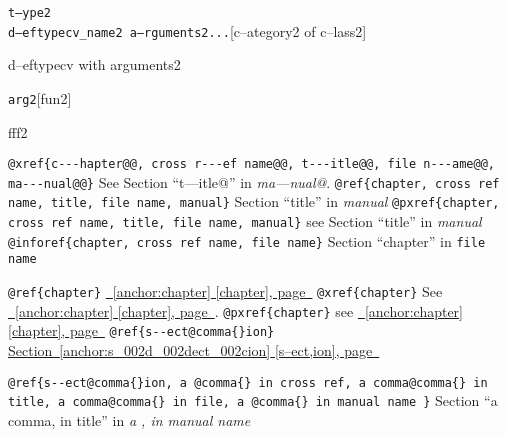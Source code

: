 \documentclass{book}
\begin{document}
\begin{titlepage}
\noindent\texttt\bgroup{}t--ype2\leavevmode{}\\d--eftypecv\_name2 a--rguments2...\egroup{}\hfill[c--ategory2 of c--lass2]



%
d--eftypecv with arguments2

\noindent\texttt\bgroup{}arg2\egroup{}\hfill[fun2]



%
fff2


\texttt{@xref\{c{-}{-}{-}hapter@@, cross r{-}{-}{-}ef name@@, t{-}{-}{-}itle@@, file n{-}{-}{-}ame@@, ma{-}{-}{-}nual@@\}} See Section ``t---itle@'' in \textit{ma---nual@}.
\texttt{@ref\{chapter, cross ref name, title, file name, manual\}} Section ``title'' in \textit{manual}
\texttt{@pxref\{chapter, cross ref name, title, file name, manual\}} see Section ``title'' in \textit{manual}
\texttt{@inforef\{chapter, cross ref name, file name\}} Section ``chapter'' in \texttt{file name}

\texttt{@ref\{chapter\}} \hyperref[anchor:chapter]{\chaptername~\ref*{anchor:chapter} [chapter], page~\pageref*{anchor:chapter}}
\texttt{@xref\{chapter\}} See \hyperref[anchor:chapter]{\chaptername~\ref*{anchor:chapter} [chapter], page~\pageref*{anchor:chapter}}.
\texttt{@pxref\{chapter\}} see \hyperref[anchor:chapter]{\chaptername~\ref*{anchor:chapter} [chapter], page~\pageref*{anchor:chapter}}
\texttt{@ref\{s{-}{-}ect@comma\{\}ion\}} \hyperref[anchor:s_002d_002dect_002cion]{Section~\ref*{anchor:s_002d_002dect_002cion} [s--ect,ion], page~\pageref*{anchor:s_002d_002dect_002cion}}

\texttt{@ref\{s{-}{-}ect@comma\{\}ion, a @comma\{\} in cross
ref, a comma@comma\{\} in title, a comma@comma\{\} in file, a @comma\{\} in manual name \}}
Section ``a comma, in title'' in \textit{a , in manual name}


\end{titlepage}
\end{document}
